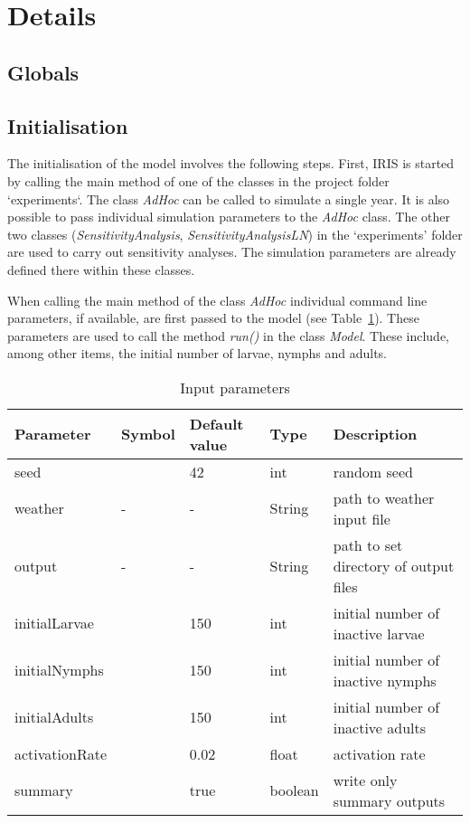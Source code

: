 \documentclass[a4paper, 11pt]{scrartcl}
\begin{document}
\newpage


\section{Details}

\subsection{Globals}

\subsection{Initialisation}
The initialisation of the model involves the following steps. First, IRIS is started by calling the main method of one of the classes in the project folder `experiments`. The class \textit{AdHoc} can be called to simulate a single year. It is also possible to pass individual simulation parameters to the \textit{AdHoc} class. The other two classes (\textit{SensitivityAnalysis}, \textit{SensitivityAnalysisLN}) in the `experiments' folder are used to carry out sensitivity analyses. The simulation parameters are already defined there within these classes.

When calling the main method of the class \textit{AdHoc} individual command line parameters, if available, are first passed to the model (see Table~\ref{tab:initialisation_parameters}). These parameters are used to call the method \textit{run()} in the class \textit{Model}. These include, among other items, the initial number of larvae, nymphs and adults.

\begin{table}[h!]
\caption{Input parameters}
\label{tab:initialisation_parameters}
\begin{tabularx}{\textwidth}{lllll}
\toprule
\textbf{Parameter} 	& \textbf{Symbol} & \textbf{Default value} & \textbf{Type} & \textbf{Description} \\
\midrule
seed    			&   & 42    & int     & random seed \\
weather     		& - & -     & String  & path to weather input file \\
output     			& - & -     & String  & path to set directory of output files \\
initialLarvae       &   & 150   & int     & initial number of inactive larvae \\
initialNymphs       &   & 150   & int     & initial number of inactive nymphs \\
initialAdults       &   & 150   & int     & initial number of inactive adults \\
activationRate      &   & 0.02  & float   & activation rate  \\
summary       		&   & true & boolean & write only summary outputs \\
\bottomrule
\end{tabularx}
\end{table}
\end{document}
